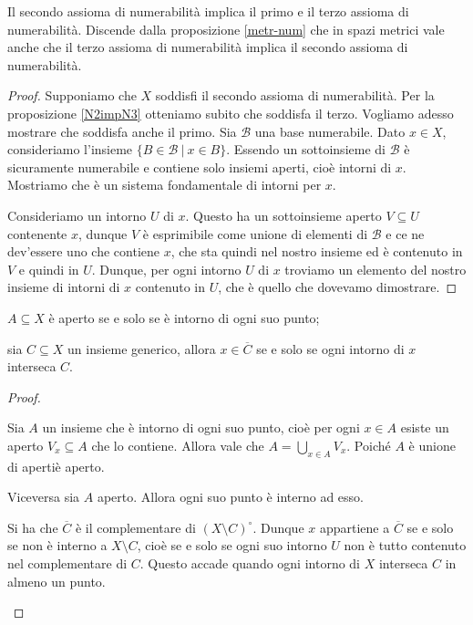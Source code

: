 \documentclass{article}
\begin{document}
\begin{prop} \label{N2power}
	Il secondo assioma di numerabilità implica il primo e il terzo assioma di
	numerabilità. Discende dalla proposizione \ref{metr-num} che in spazi
	metrici vale anche che il terzo assioma di numerabilità implica il secondo
	assioma di numerabilità.
\end{prop}

\begin{proof}
	Supponiamo che $X$ soddisfi il secondo assioma di numerabilità. Per la
	proposizione \ref{N2impN3} otteniamo subito che soddisfa il terzo. Vogliamo
	adesso mostrare che soddisfa anche il primo. Sia $\mathcal{B}$ una base
	numerabile. Dato $x \in X$, consideriamo l'insieme ${\{ B \in \mathcal{B}\
	|\ x \in B \}}$. Essendo un sottoinsieme di $\mathcal{B}$ è sicuramente
	numerabile e contiene solo insiemi aperti, cioè intorni di $x$. Mostriamo
	che è un sistema fondamentale di intorni per $x$.

	Consideriamo un intorno $U$ di $x$. Questo ha un sottoinsieme aperto $V
	\subseteq U$ contenente $x$, dunque $V$ è esprimibile come unione di
	elementi di $\mathcal{B}$ e ce ne dev'essere uno che contiene $x$, che sta
	quindi nel nostro insieme ed è contenuto in $V$ e quindi in $U$. Dunque, per
	ogni intorno $U$ di $x$ troviamo un elemento del nostro insieme di intorni
	di $x$ contenuto in $U$, che è quello che dovevamo dimostrare.
\end{proof}

\begin{prop}
	\begin{nlist}
		\item $A \subseteq X$ è aperto se e solo se è intorno di ogni suo punto;
		\item sia $C \subseteq X$ un insieme generico, allora $x \in
		\overline{C}$ se e solo se ogni intorno di $x$ interseca $C$.
	\end{nlist}
\end{prop}

\begin{proof}
\begin{nlist}
\item Sia $A$ un insieme che \`e intorno di ogni suo punto, cio\`e per ogni $x
\in A$ esiste un aperto $V_x \subseteq A$ che lo contiene. Allora vale che $\displaystyle A =
\bigcup_{x \in A} V_x$. Poiché $A$ \`e unione di aperti\`e aperto.

Viceversa sia $A$ aperto. Allora ogni suo punto \`e interno ad esso.

\item Si ha che $\overline{C}$ \`e il complementare di $(X\setminus C)^\circ$.
Dunque $x$ appartiene a $\overline{C}$ se e solo se non \`e interno a $X
\setminus C$, cioè se e solo se ogni suo intorno $U$ non \`e tutto contenuto nel
complementare di $C$. Questo accade quando ogni intorno di $X$ interseca $C$ in
almeno un punto.

\end{nlist}
\end{proof}
\end{document}
